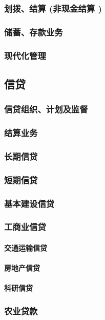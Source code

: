 \documentclass[UTF8]{../../RepresentationUniverse}
\begin{document}
        \subsubsection{划拨、结算 (非现金结算 )}
        \subsubsection{储蓄、存款业务}
        \subsubsection{现代化管理}
    \subsection{信贷}
        \subsubsection{信贷组织、计划及监督}
        \subsubsection{结算业务}
        \subsubsection{长期信贷}
        \subsubsection{短期信贷}
        \subsubsection{基本建设信贷}
        \subsubsection{工商业信贷}
            \paragraph{交通运输信贷}
            \paragraph{房地产信贷}
            \paragraph{科研信贷}
        \subsubsection{农业贷款}
\end{document}
